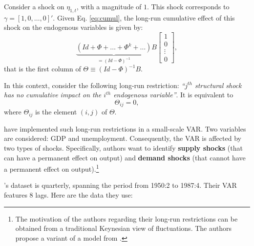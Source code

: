 \documentclass[
  12pt,
]{book}
\newenvironment{Shaded}{\begin{snugshade}}{\end{snugshade}}
\newcommand{\AttributeTok}[1]{\textcolor[rgb]{0.77,0.63,0.00}{#1}}
\newcommand{\DecValTok}[1]{\textcolor[rgb]{0.00,0.00,0.81}{#1}}
\newcommand{\FunctionTok}[1]{\textcolor[rgb]{0.00,0.00,0.00}{#1}}
\newcommand{\NormalTok}[1]{#1}
\newcommand{\SpecialCharTok}[1]{\textcolor[rgb]{0.00,0.00,0.00}{#1}}
\newcommand{\StringTok}[1]{\textcolor[rgb]{0.31,0.60,0.02}{#1}}
\theoremstyle{definition}
\theoremstyle{definition}
\theoremstyle{definition}
\theoremstyle{definition}
\theoremstyle{remark}
\begin{document}
Consider a shock on \(\eta_{1,t}\), with a magnitude of \(1\). This shock corresponds to \(\gamma = [1,0,\dots,0]'\). Given Eq. \eqref{eq:cumul}, the long-run cumulative effect of this shock on the endogenous variables is given by:
\[
\underbrace{(Id+\Phi+\ldots+\Phi^{k}+\ldots)}_{=(Id - \Phi)^{-1}}B\left[\begin{array}{c}
1\\
0\\
\vdots\\
0\end{array}\right],
\]
that is the first column of \(\Theta \equiv (Id - \Phi)^{-1}B\).

In this context, consider the following long-run restriction: \emph{``\(j^{th}\) structural shock has no cumulative impact on the \(i^{th}\) endogenous variable''}. It is equivalent to
\[
\Theta_{ij}=0,
\]
where \(\Theta_{ij}\) is the element \((i,j)\) of \(\Theta\).

\citet{Blanchard_Quah_1989} have implemented such long-run restrictions in a small-scale VAR. Two variables are considered: GDP and unemployment. Consequently, the VAR is affected by two types of shocks. Specifically, authors want to identify \textbf{supply shocks} (that can have a permanent effect on output) and \textbf{demand shocks} (that cannot have a permanent effect on output).\footnote{The motivation of the authors regarding their long-run restrictions can be obtained from a traditional Keynesian view of fluctuations. The authors propose a variant of a model from \citet{Fischer_1977}.
}

\citet{Blanchard_Quah_1989}'s dataset is quarterly, spanning the period from 1950:2 to 1987:4. Their VAR features 8 lags. Here are the data they use:

\begin{Shaded}
\end{Shaded}
\end{document}

